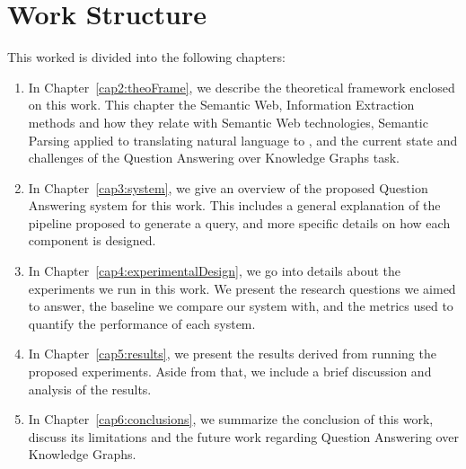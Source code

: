 \section{Work Structure}
This worked is divided into the following chapters:

\begin{enumerate}
    \item In Chapter~\ref{cap2:theoFrame}, we describe the theoretical framework 
    enclosed on this work. This chapter the Semantic 
    Web, Information Extraction methods and how they relate with Semantic Web 
    technologies, Semantic Parsing applied to translating natural language to 
    \SPARQL, and the current state and challenges of the Question Answering over 
    Knowledge Graphs task.
    \item In Chapter~\ref{cap3:system}, we give an overview of the proposed Question 
    Answering system for this work. This includes a general explanation of the 
    pipeline proposed to generate a \SPARQL{} query, and more specific details on how 
    each component is designed.    
    \item In Chapter~\ref{cap4:experimentalDesign}, we go into details about the 
    experiments we run in this work. We present the research questions we aimed to answer, 
    the baseline we compare our system with, and the metrics used to quantify the 
    performance of each system.    
    \item In Chapter~\ref{cap5:results}, we present the results derived from running the 
    proposed experiments. Aside from that, we include a brief discussion and analysis of 
    the results.    
    \item In Chapter~\ref{cap6:conclusions}, we summarize the conclusion of this work, 
    discuss its limitations and the future work regarding Question Answering over 
    Knowledge Graphs.
    
\end{enumerate}
